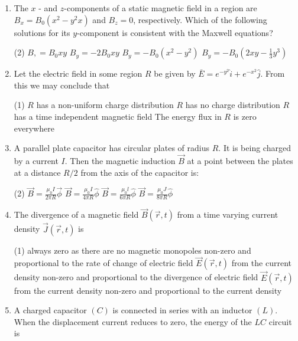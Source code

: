 \begin{enumerate}
	\item 	The $x$ - and $z$-components of a static magnetic field in a region are $B_{x}=B_{0}\left(x^{2}-y^{2} x\right)$ and $B_{z}=0$, respectively. Which of the following solutions for its $y$-component is consistent with the Maxwell equations?
	 \begin{tasks}(2)
		\task[\textbf{a.}]$B,=B_{0} x y$
		\task[\textbf{b.}]$B_{y}=-2 B_{0} x y$
		\task[\textbf{c.}]$B_{y}=-B_{0}\left(x^{2}-y^{2}\right)$
		\task[\textbf{d.}] $B_{y}=-B_{0}\left(2 x y-\frac{1}{3} y^{3}\right)$
	\end{tasks}
\item 	Let the electric field in some region $R$ be given by $\bar{E}=e^{-y^{2}} \hat{i}+e^{-x^{2}} \hat{j}$. From this we may conclude that
	 \begin{tasks}(1)
		\task[\textbf{a.}]$R$ has a non-uniform charge distribution
		\task[\textbf{b.}] $R$ has no charge distribution
		\task[\textbf{c.}]$R$ has a time independent magnetic field
		\task[\textbf{d.}]  The energy flux in $R$ is zero everywhere
	\end{tasks}
\item A parallel plate capacitor has circular plates of radius $R$. It is being charged by a current $I$. Then the magnetic induction $\vec{B}$ at a point between the plates at a distance $R / 2$ from the axis of the capacitor is:
	 \begin{tasks}(2)
		\task[\textbf{a.}]$\vec{B}=\frac{\mu_{0} I}{2 \pi R} \vec{\phi}$
		\task[\textbf{b.}]$\vec{B}=\frac{\mu_{0} I}{4 \pi R} \hat{\phi}$
		\task[\textbf{c.}]$\vec{B}=\frac{\mu_{0} l}{6 \pi R} \hat{\phi}$
		\task[\textbf{d.}]  $\vec{B}=\frac{\mu_{0} J}{8 \pi R} \hat{\phi}$	
	\end{tasks}
\item 	The divergence of a magnetic field $\vec{B}(\vec{r}, t)$ from a time varying current density $\vec{J}(\vec{r}, t)$ is
	 \begin{tasks}(1)
		\task[\textbf{a.}]always zero as there are no magnetic monopoles
		\task[\textbf{b.}] non-zero and proportional to the rate of change of electric field $\vec{E}(\vec{r}, t)$ from the current density
		\task[\textbf{c.}]non-zero and proportional to the divergence of electric field $\vec{E}(\vec{r}, t)$ from the current density
		\task[\textbf{d.}]  non-zero and proportional to the current density
	\end{tasks}
\item A charged capacitor $(C)$ is connected in series with an inductor $(L)$. When the displacement current reduces to zero, the energy of the $L C$ circuit is

\end{enumerate}
